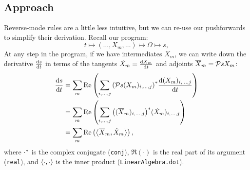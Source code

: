 \documentclass[../../main.tex]{subfiles}
\begin{document}
\begin{refsection}
\subsection{Approach}\label{approach-1}

Reverse-mode rules are a little less intuitive, but we can re-use our pushforwards to simplify their derivation.
Recall our program:
\[t \mapsto (\ldots, X_m, \ldots) \mapsto \Omega \mapsto s,\]
At any step in the program, if we have intermediates $X_m$, we can write down the derivative $\dv{s}{t}$ in terms of the tangents $\dot{X}_m = \dv{X_m}{t}$ and adjoints $\Dcot{X}_m = \pv{s}{X_m}$:
\begin{align*}
	\dv{s}{t}
	 & = \sum_m \Re\left( \sum_{i,\ldots,j}
	\conj{\left(  \pv{s}{(X_m)_{i,\ldots,j}}  \right)}
	\dv{(X_m)_{i,\ldots,j}}{t}
	\right)                                 \\
	 & = \sum_m \Re\left( \sum_{i,\ldots,j}
	\conj{\left(  (\Dcot{X}_m)_{i,\ldots,j}  \right)}
		(\Dtan{X}_m)_{i,\ldots,j}
	\right)                                 \\
	 & = \sum_m \Re\left(
	\inner{ \Dcot{X}_m }
	{ \Dtan{X}_m }
	\right),
\end{align*}
where ${\cdot}^*$ is the complex conjugate (\texttt{conj}), $\Re(\cdot)$ is the real part of its argument (\texttt{real}), and $\left\langle \cdot, \cdot \right\rangle$ is the inner product (\texttt{LinearAlgebra.dot}).\footnotemark



\end{refsection}
\end{document}
